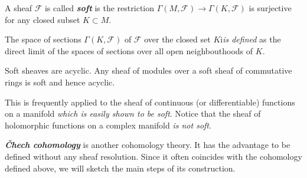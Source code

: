 \documentclass{article}
\newcommand{\Fc}{\mathcal{F}}
\begin{document}
\begin{defn}
	A sheaf $\Fc$ is called \textbf{\textit{soft}} is the restriction $\Gamma(M,\Fc)\to\Gamma(K,\Fc)$ is surjective for any closed subset $K\subset M$.
	
	The space of sections $\Gamma(K,\Fc)$ of $\Fc$ over the closed set $K$i\textit{is defined} as the direct limit of the spaces of sections over all open neighbouthoods of $K$.
\end{defn}
\begin{prop}
	Soft sheaves are acyclic. Any sheaf of modules over a soft sheaf of commutative rings is soft and hence acyclic.
\end{prop}
\begin{remark}
	This is frequently applied to the sheaf of continuous (or differentiable) functions on a manifold \textit{which is easily shown to be soft}. Notice that the sheaf of holomorphic functions on a complex manifold \textit{is not soft}.
\end{remark}

\textbf{\textit{\v Chech cohomology}} is another cohomology theory. It has the advantage to be defined without any sheaf resolution. Since it often coincides with the cohomology defined above, we will sketch the main steps of its construction.
\end{document}
